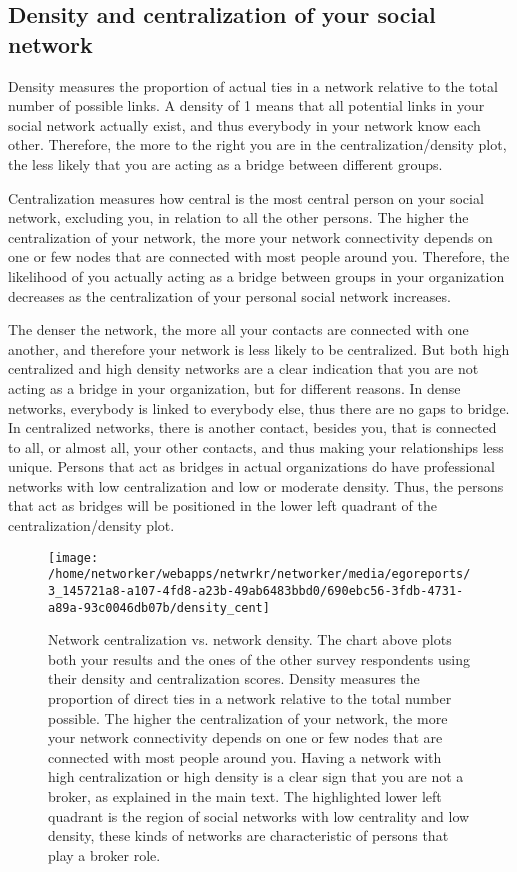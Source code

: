 \documentclass[a4paper,12pt]{article}
\begin{document}
\subsection*{Density and centralization of your social network}


Density measures the proportion of actual ties in a network relative to the total number of possible links. A density of 1 means that all potential links in your social network actually exist, and thus everybody in your network know each other. Therefore, the more to the right you are in the centralization/density plot, the less likely that you are acting as a bridge between different groups.

Centralization measures how central is the most central person on your social network, excluding you, in relation to all the other persons. The higher the centralization of your network, the more your network connectivity depends on one or few nodes that are connected with most people around you. Therefore, the likelihood of you actually acting as a bridge between groups in your organization decreases as the centralization of your personal social network increases.

The denser the network, the more all your contacts are connected with one another, and therefore your network is less likely to be centralized. But both high centralized and high density networks are a clear indication that you are not acting as a bridge in your organization, but for different reasons. In dense networks, everybody is linked to everybody else, thus there are no gaps to bridge. In centralized networks, there is another contact, besides you, that is connected to all, or almost all, your other contacts, and thus making your relationships less unique. Persons that act as bridges in actual organizations do have professional networks with low centralization and low or moderate density. Thus, the persons that act as bridges will be positioned in the lower left quadrant of the centralization/density plot.


\begin{figure}[H]
\centering
\texttt{[image: /home/networker/webapps/netwrkr/networker/media/egoreports/3\_145721a8-a107-4fd8-a23b-49ab6483bbd0/690ebc56-3fdb-4731-a89a-93c0046db07b/density\_cent]}
\caption{Network centralization vs. network density. The chart above plots both your results and the ones of the other survey respondents using their density and centralization scores. Density measures the proportion of direct ties in a network relative to the total number possible. The higher the centralization of your network, the more your network connectivity depends on one or few nodes that are connected with most people around you. Having a network with high centralization or high density is a clear sign that you are not a broker, as explained in the main text. The highlighted lower left quadrant is the region of social networks with low centrality and low density, these kinds of networks are characteristic of persons that play a broker role.}
\end{figure}
\end{document}
